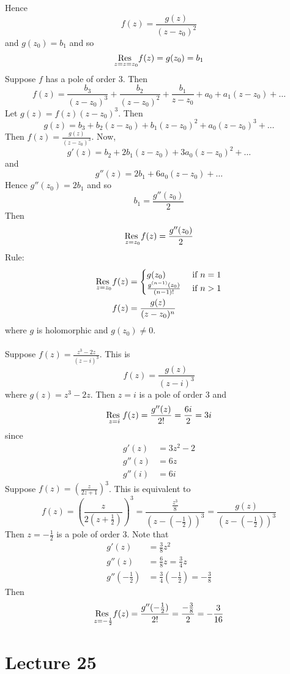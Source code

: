 \documentclass[12pt]{article}
\begin{document}
Hence $$f(z) = \frac{g(z)}{(z-z_0)^2} $$ and $g(z_0) = b_1$ and so $$ \underset{z=z=z_0}{\text{Res }} f(z) = g(z_0) = b_1$$ 
Suppose $f$ has a pole of order $3$. Then $$f(z) = \frac{b_3}{(z-z_0)^3} + \frac{b_2}{(z-z_0)^2} + \frac{b_1}{z-z_0} + a_0 + a_1(z-z_0) + \dots $$ Let $g(z) = f(z)(z-z_0)^3$. Then $$g(z) = b_3 + b_2(z-z_0) + b_1(z-z_0)^2 + a_0(z-z_0)^3 + \dots $$ Then $f(z) = \frac{g(z)}{(z-z_0)^3}$. Now, $$g'(z) = b_2 + 2b_1(z-z_0) + 3a_0(z-z_0)^2 + \dots $$ and $$ g''(z) = 2b_1 + 6a_0(z-z_0) + \dots $$ 
Hence $g''(z_0) = 2b_1$ and so $$b_1 = \frac{g''(z_0)}{2} $$ Then $$ \underset{z=z_0}{\text{Res }} f(z) = \frac{g''(z_0)}{2} $$ 
Rule: $$ \begin{aligned} \underset{z=z_0}{\text{Res }} f(z) &= \begin{cases} g(z_0) &\text{ if } n=1 \\ \frac{g^{(n-1)}(z_0)}{(n-1)!} &\text{ if } n > 1 \end{cases} \\ f(z) &= \frac{g(z)}{(z-z_0)^n} \end{aligned} $$ where $g$ is holomorphic and $g(z_0) \neq 0$. 
\\~\\
Suppose $f(z) = \frac{z^3 -2z}{(z-i)^3}$. This is $$f(z) = \frac{g(z)}{(z-i)^3} $$ where $g(z) = z^3 - 2z$. Then $z=i$ is a pole of order $3$ and $$\underset{z=i}{\text{Res }} f(z) = \frac{g''(z)}{2!} = \frac{6i}{2} = 3i $$ 
since $$ \begin{aligned} g'(z) &= 3z^2 - 2 \\ g''(z) &= 6z \\ g''(i) &= 6i \end{aligned} $$ 
Suppose $f(z) = (\frac{z}{2z +1})^3$. This is equivalent to $$ f(z) = (\frac{z}{2(z + \frac{1}{2})})^3 = \frac{\frac{z^3}{8}}{(z-(-\frac{1}{2}))^3} = \frac{g(z)}{(z - (-\frac{1}{2}))^3} $$ 
Then $z = -\frac{1}{2}$ is a pole of order $3$. Note that $$ \begin{aligned} g'(z) &= \frac{3}{8}z^2 \\ g''(z) &= \frac{6}{8}z = \frac{3}{4}z \\ g''(-\frac{1}{2}) &= \frac{3}{4}(-\frac{1}{2}) = -\frac{3}{8} \end{aligned} $$
Then $$ \underset{z=-\frac{1}{2}}{\text{Res }} f(z) = \frac{g''(-\frac{1}{2})}{2!} = \frac{-\frac{3}{8}}{2} = -\frac{3}{16} $$ 

\section{Lecture 25} 
\end{document}
